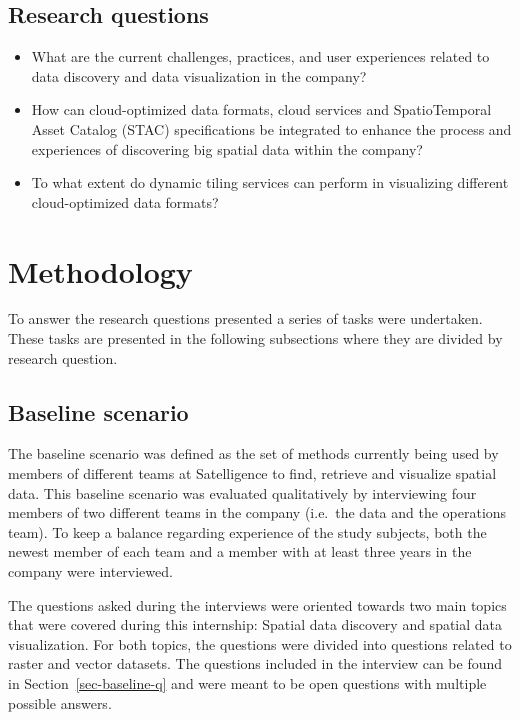 \documentclass[
  oneside,
  open=any]{scrbook}
\providecommand{\tightlist}{%
  \setlength{\itemsep}{0pt}\setlength{\parskip}{0pt}}\usepackage{longtable,booktabs,array}
\begin{document}
\section{Research questions}\label{research-questions}

\begin{itemize}
\tightlist
\item
  What are the current challenges, practices, and user experiences
  related to data discovery and data visualization in the company?
\item
  How can cloud-optimized data formats, cloud services and
  SpatioTemporal Asset Catalog (STAC) specifications be integrated to
  enhance the process and experiences of discovering big spatial data
  within the company?
\item
  To what extent do dynamic tiling services can perform in visualizing
  different cloud-optimized data formats?
\end{itemize}

\chapter{Methodology}\label{methodology}

To answer the research questions presented a series of tasks were
undertaken. These tasks are presented in the following subsections where
they are divided by research question.

\section{Baseline scenario}\label{sec-baseline}

The baseline scenario was defined as the set of methods currently being
used by members of different teams at Satelligence to find, retrieve and
visualize spatial data. This baseline scenario was evaluated
qualitatively by interviewing four members of two different teams in the
company (i.e.~the data and the operations team). To keep a balance
regarding experience of the study subjects, both the newest member of
each team and a member with at least three years in the company were
interviewed.

The questions asked during the interviews were oriented towards two main
topics that were covered during this internship: Spatial data discovery
and spatial data visualization. For both topics, the questions were
divided into questions related to raster and vector datasets. The
questions included in the interview can be found in
Section~\ref{sec-baseline-q} and were meant to be open questions with
multiple possible answers.
\end{document}
